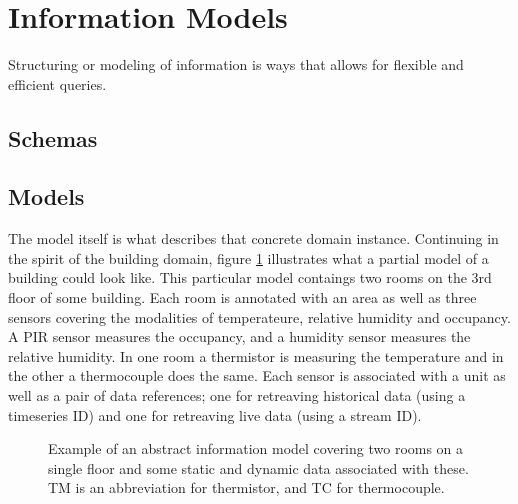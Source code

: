 \section{Information Models}

Structuring or modeling of information is ways that allows for flexible and efficient queries.

\subsection{Schemas}

\subsection{Models}

The model itself is what describes that concrete domain instance. Continuing in the spirit of the building domain, figure \ref{fig:topics:info:model} illustrates what a partial model of a building could look like. This particular model contaings two rooms on the 3rd floor of some building. Each room is annotated with an area as well as three sensors covering the modalities of temperateure, relative humidity and occupancy. A PIR sensor measures the occupancy, and a humidity sensor measures the relative humidity. In one room a thermistor is measuring the temperature and in the other a thermocouple does the same. Each sensor is associated with a unit as well as a pair of data references; one for retreaving historical data (using a timeseries ID) and one for retreaving live data (using a stream ID).

\begin{figure}[tbp]
  \begin{center}
  \end{center}
  \caption[Example of an abstract information model]{Example of an abstract information model covering two rooms on a single floor and some static and dynamic data associated with these. TM is an abbreviation for thermistor, and TC for thermocouple.}
  \label{fig:topics:info:model}
\end{figure}

